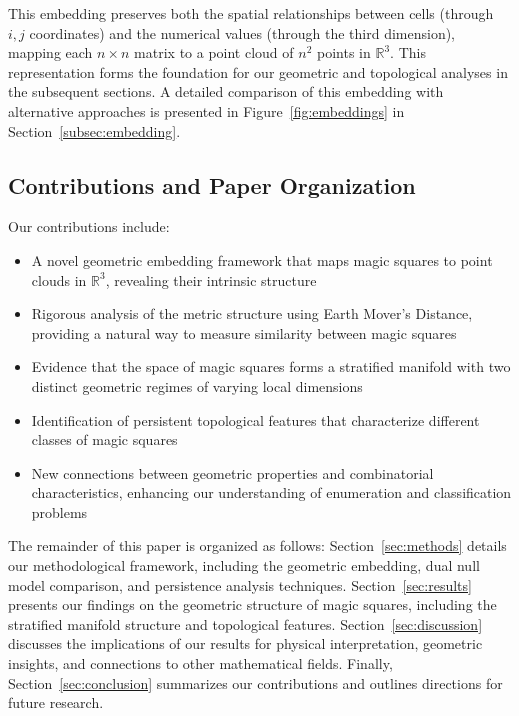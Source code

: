 This embedding preserves both the spatial relationships between cells (through $i,j$ coordinates) and the numerical values (through the third dimension), mapping each $n \times n$ matrix to a point cloud of $n^2$ points in $\mathbb{R}^3$. This representation forms the foundation for our geometric and topological analyses in the subsequent sections. A detailed comparison of this embedding with alternative approaches is presented in Figure~\ref{fig:embeddings} in Section~\ref{subsec:embedding}.

\subsection{Contributions and Paper Organization}

Our contributions include:
\begin{itemize}
    \item A novel geometric embedding framework that maps magic squares to point clouds in $\mathbb{R}^3$, revealing their intrinsic structure
    \item Rigorous analysis of the metric structure using Earth Mover's Distance, providing a natural way to measure similarity between magic squares
    \item Evidence that the space of magic squares forms a stratified manifold with two distinct geometric regimes of varying local dimensions
    \item Identification of persistent topological features that characterize different classes of magic squares
    \item New connections between geometric properties and combinatorial characteristics, enhancing our understanding of enumeration and classification problems
\end{itemize}

The remainder of this paper is organized as follows: Section~\ref{sec:methods} details our methodological framework, including the geometric embedding, dual null model comparison, and persistence analysis techniques. Section~\ref{sec:results} presents our findings on the geometric structure of magic squares, including the stratified manifold structure and topological features. Section~\ref{sec:discussion} discusses the implications of our results for physical interpretation, geometric insights, and connections to other mathematical fields. Finally, Section~\ref{sec:conclusion} summarizes our contributions and outlines directions for future research. 